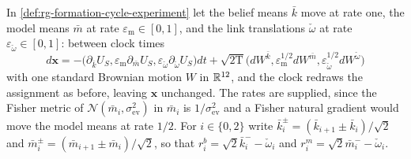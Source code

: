 In \cref{def:rg-formation-cycle-experiment} let the belief means $\bar k$ move at
rate one, the model means $\bar m$ at rate $\varepsilon_{\mathrm m}\in[0,1]$, and the
link translations $\check\omega$ at rate $\varepsilon_{\check\omega}\in[0,1]$: between clock times
\begin{equation}
d\mathbf x=-\bigl(\partial_{\bar k}U_S,\varepsilon_{\mathrm m}\partial_{\bar m}U_S,
\varepsilon_{\check\omega}\partial_{\check\omega} U_S\bigr)dt
+\sqrt{2\mathrm T}\bigl(dW^{\bar k},\varepsilon_{\mathrm m}^{1/2}dW^{\bar m},
\varepsilon_{\check\omega}^{1/2}dW^{\check\omega}\bigr)
\label{eq:obs-cycle-slow-model-kinetics}
\end{equation}
with one standard Brownian motion $W$ in $\mathbb R^{12}$, and the clock redraws the
assignment as before, leaving $\mathbf x$ unchanged. The rates are supplied, since
the Fisher metric of $\mathcal N(\bar m_i,\sigma^2_{\mathrm{ev}})$ in $\bar m_i$ is
$1/\sigma^2_{\mathrm{ev}}$ and a Fisher natural gradient would move the model means at
rate $1/2$. For $i\in\{0,2\}$ write $\bar k^\pm_i=(\bar k_{i+1}\pm\bar k_i)/\sqrt2$
and $\bar m^\pm_i=(\bar m_{i+1}\pm\bar m_i)/\sqrt2$, so that
$r^b_i=\sqrt2\bar k^-_i-\check\omega_i$ and $r^m_i=\sqrt2\bar m^-_i-\check\omega_i$.
